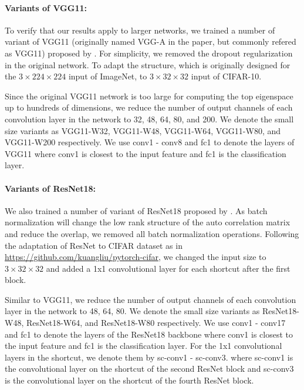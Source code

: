 \paragraph{Variants of VGG11:} To verify that our results apply to larger networks, we trained a number of variant of VGG11 (originally named VGG-A in the paper, but commonly refered as VGG11) proposed by \citet{simonyan2014very}. For simplicity, we removed the dropout regularization in the original network. To adapt the structure, which is originally designed for the $3\times224\times224$ input of ImageNet, to $3\times32\times32$ input of CIFAR-10.

Since the original VGG11 network is too large for computing the top eigenspace up to hundreds of dimensions, we reduce the number of output channels of each convolution layer in the network to 32, 48, 64, 80, and  200. We denote the small size variants as VGG11-W32, VGG11-W48, VGG11-W64, VGG11-W80, and VGG11-W200 respectively. We use conv1 - conv8 and fc1 to denote the layers of VGG11 where conv1 is closest to the input feature and fc1 is the classification layer.

\paragraph{Variants of ResNet18:} We also trained a number of variant of ResNet18 proposed by \citet{kaiming2015}. As batch normalization will change the low rank structure of the auto correlation matrix and reduce the overlap, we removed all batch normalization operations.
Following the adaptation of ResNet to CIFAR dataset as in \url{https://github.com/kuangliu/pytorch-cifar}, we changed the input size to $3\times32\times32$ and added a 1x1 convolutional layer for each shortcut after the first block.

Similar to VGG11, we reduce the number of output channels of each convolution layer in the network to 48, 64, 80. We denote the small size variants as ResNet18-W48, ResNet18-W64, and ResNet18-W80 respectively.
We use conv1 - conv17 and fc1 to denote the layers of the ResNet18 backbone where conv1 is closest to the input feature and fc1 is the classification layer. For the 1x1 convolutional layers in the shortcut, we denote them by sc-conv1 - sc-conv3. where sc-conv1 is the convolutional layer on the shortcut of the second ResNet block and  sc-conv3 is the convolutional layer on the shortcut of the fourth ResNet block.

